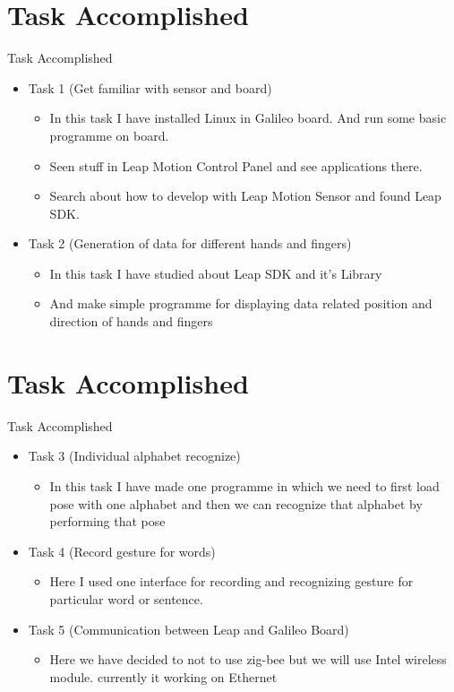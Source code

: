 \documentclass[10pt, a4paper]{beamer}
\begin{document}
\section{Task Accomplished}
\begin{frame}{Task Accomplished}
	\begin{itemize}
		\item Task 1 (Get familiar with sensor and board)
		\begin{itemize}
		    \item In this task I have installed Linux in Galileo board. And run some basic programme on board.
		    \item Seen stuff in Leap Motion Control Panel and see applications there.
		    \item Search about how to develop with Leap Motion Sensor and found Leap SDK.
		\end{itemize}
		\item Task 2 (Generation of data for different hands and fingers)
		\begin{itemize}
		    \item In this task I have studied about Leap SDK and it's Library 
		    \item And make simple programme for displaying  data related position and direction of hands and fingers
		\end{itemize}
	\end{itemize}
\end{frame}
\section{Task Accomplished}
\begin{frame}{Task Accomplished}
    \begin{itemize}
        \item Task 3 (Individual alphabet recognize)
		\begin{itemize}
		    \item In this task I have made one programme in which we need to first load pose with one alphabet and then we can recognize that alphabet by performing that pose
		\end{itemize}
		\item Task 4 (Record gesture for words)
		\begin{itemize}
		    \item Here I used one interface for recording and recognizing gesture for particular word or sentence.
		\end{itemize}
		\item Task 5 (Communication between Leap and Galileo Board)
		\begin{itemize}
		    \item Here we have decided to not to use zig-bee but we will use Intel wireless module. currently it working on Ethernet
		\end{itemize}
	\end{itemize}
\end{frame}
\end{document}
